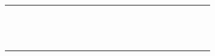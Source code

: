 \documentclass[10pt]{article}
\begin{document}
\begin{center}
\begin{tabular}{|c|c|c|c|c|c|c|c|c|c|c|c|c|c|c|c|c|c|c|c|c|c|c|c|}
\hline
 &  &  &  &  &  &  &  &  &  &  &  &  &  &  &  &  &  &  &  &  &  &  &  \\
\hline
 &  &  &  &  &  &  &  &  &  &  &  &  &  &  &  &  &  &  &  &  &  &  &  \\
\hline
 &  &  &  &  &  &  &  &  &  &  &  &  &  &  &  &  &  &  &  &  &  &  &  \\
\hline
 &  &  &  &  &  &  &  &  &  &  &  &  &  &  &  &  &  &  &  &  &  &  &  \\
\hline
 &  &  &  &  &  &  &  &  &  &  &  &  &  &  &  &  &  &  &  &  &  &  &  \\
\hline
 &  &  &  &  &  &  &  &  &  &  &  &  &  &  &  &  &  &  &  &  &  &  &  \\
\hline
 &  &  &  &  &  &  &  &  &  &  &  &  &  &  &  &  &  &  &  &  &  &  &  \\
\hline
 &  &  &  &  &  &  &  &  &  &  &  &  &  &  &  &  &  &  &  &  &  &  &  \\
\hline
 &  &  &  &  &  &  &  &  &  &  &  &  &  &  &  &  &  &  &  &  &  &  &  \\
\hline
 &  &  &  &  &  &  &  &  &  &  &  &  &  &  &  &  &  &  &  &  &  &  &  \\
\hline
 &  &  &  &  &  &  &  &  &  &  &  &  &  &  &  &  &  &  &  &  &  &  &  \\
\hline
 &  &  &  &  &  &  &  &  &  &  &  &  &  &  &  &  &  &  &  &  &  &  &  \\
\hline
 &  &  &  &  &  &  &  &  &  &  &  &  &  &  &  &  &  &  &  &  &  &  &  \\
\hline
 &  &  &  &  &  &  &  &  &  &  &  &  &  &  &  &  &  &  &  &  &  &  &  \\
\hline
 &  &  &  &  &  &  &  &  &  &  &  &  &  &  &  &  &  &  &  &  &  &  &  \\
\hline
\end{tabular}
\end{center}
\end{document}
